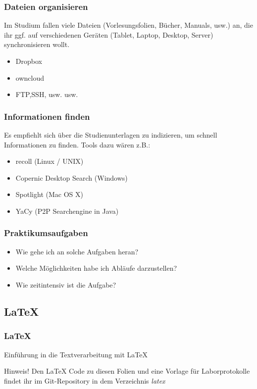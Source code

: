 \documentclass[german,ignorenonframetext]{beamer} %
\begin{document}
\begin{frame}
\frametitle{Dateien organisieren}
Im Studium fallen viele Dateien (Vorlesungsfolien, Bücher, Manuals, usw.) an, die ihr ggf. auf verschiedenen Geräten (Tablet, Laptop, Desktop, Server) synchronisieren wollt.
\begin{itemize}
\pause
\item Dropbox
\pause	
\item owncloud
\pause
\item FTP,SSH, usw. usw.
\end{itemize}
\end{frame}

\begin{frame}
\frametitle{Informationen finden}
Es empfiehlt sich über die Studienunterlagen zu indizieren, um schnell Informationen zu finden. Tools dazu wären z.B.:
\begin{itemize}
\item recoll (Linux / UNIX)
\pause
\item Copernic Desktop Search (Windows)
\pause
\item Spotlight (Mac OS X)
\pause
\item YaCy (P2P Searchengine in Java)
\end{itemize}
\end{frame}

\begin{frame}
\frametitle{Praktikumsaufgaben}
\begin{itemize}
\item Wie gehe ich an solche Aufgaben heran?
\pause
\item Welche Möglichkeiten habe ich Abläufe darzustellen?
\pause
\item Wie zeitintensiv ist die Aufgabe?
\end{itemize}
\end{frame}


\subsection{LaTeX}
\begin{frame}
\frametitle{LaTeX}

Einführung in die Textverarbeitung mit LaTeX\\

\pause
\begin{block}{Hinweis!}
Den LaTeX Code zu diesen Folien und eine Vorlage für Laborprotokolle findet ihr im Git-Repository in dem Verzeichnis \textit{latex}
\end{block}
\end{frame}
\end{document}
